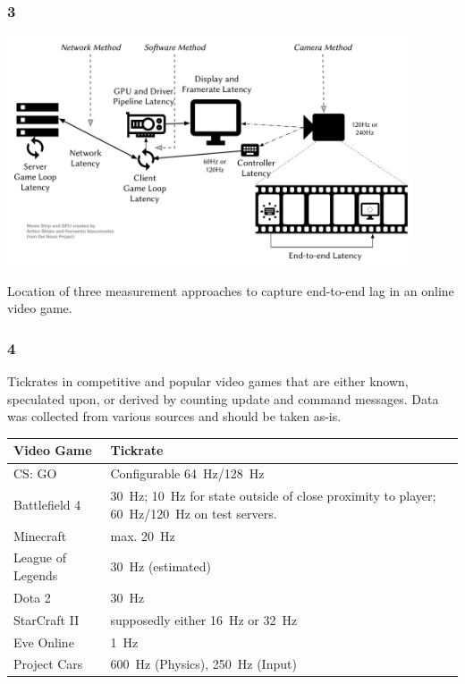 \documentclass{UDEbeamerEN}
\begin{document}
\begin{frame}
	\frametitle{3}

	\begin{center}
	    \includegraphics[width=0.9\textwidth]{../../../models/e2e-lag.pdf}

	    Location of three measurement approaches to capture end-to-end lag in an online video game.
	\end{center}

\end{frame}


\begin{frame}
	\frametitle{4}

	\begin{center}
	Tickrates in competitive and popular video games that are either known, speculated upon, or derived by counting update and command messages. Data was collected from various sources and should be taken as-is.

	{\small
		\begin{tabu}{X[0.45]X}
			\toprule
			\textbf{Video Game} & \textbf{Tickrate} \\
			\midrule
			CS: GO & Configurable \SI{64}{\hertz}/\SI{128}{\hertz} \\
			Battlefield 4 & \SI{30}{\hertz}; \SI{10}{\hertz} for state outside of close proximity to player; \SI{60}{\hertz}/\SI{120}{\hertz} on test servers. \\
			Minecraft & max. \SI{20}{\hertz} \\
			League of Legends & \SI{30}{\hertz} (estimated) \\
			Dota 2 & \SI{30}{\hertz} \\
			StarCraft II & supposedly either \SI{16}{\hertz} or \SI{32}{\hertz} \\
			Eve Online & \SI{1}{\hertz} \\
			Project Cars & \SI{600}{\hertz} (Physics), \SI{250}{\hertz} (Input) \\ %
			\bottomrule
		\end{tabu}
	}
	\end{center}

\end{frame}
\end{document}
